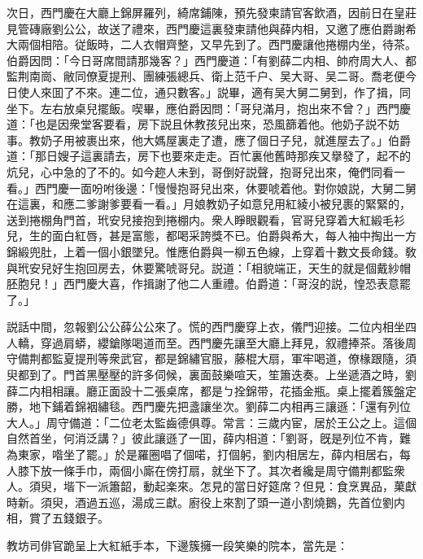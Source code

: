 次日，西門慶在大廳上錦屏羅列，綺席鋪陳，預先發柬請官客飲酒，因前日在皇莊見管磚廠劉公公，故送了禮來，西門慶這裏發柬請他與薛内相，又邀了應伯爵謝希大兩個相陪。従飯時，二人衣帽齊整，又早先到了。西門慶讓他捲棚内坐，待茶。伯爵因問：「今日哥席間請那幾客？」西門慶道：「有劉薛二内相、帥府周大人、都監荆南崗、敝同僚夏提刑、團練張總兵、衛上范千户、吴大哥、吴二哥。喬老便今日使人來囬了不來。連二位，通只數客。」説畢，適有吴大舅二舅到，作了揖，同坐下。左右放桌兒擺飯。喫畢，應伯爵因問：「哥兒滿月，抱出來不曾？」西門慶道：「也是因衆堂客要看，房下説且休教孩兒出來，恐風篩着他。他奶子説不妨事。教奶子用被裹出來，他大媽屋裏走了遭，應了個日子兒，就進屋去了。」伯爵道：「那日嫂子這裏請去，房下也要來走走。百忙裏他舊時那疾又擧發了，起不的炕兒，心中急的了不的。如今趂人未到，哥倒好説聲，抱哥兒出來，俺們同看一看。」西門慶一面吩咐後邊：「慢慢抱哥兒出來，休要唬着他。對你娘説，大舅二舅在這裏，和應二爹謝爹要看一看。」月娘教奶子如意兒用紅綾小被兒裹的緊緊的，送到捲棚角門首，玳安兒接抱到捲棚内。衆人睜眼觀看，官哥兒穿着大紅緞毛衫兒，生的面白紅唇，甚是富態，都喝采誇獎不已。伯爵與希大，每人袖中掏出一方錦緞兜肚，上着一個小銀墜兒。惟應伯爵與一柳五色線，上穿着十數文長命錢。敎與玳安兒好生抱回房去，休要驚唬哥兒。説道：「相貌端正，天生的就是個戴紗帽胚胞兒！」西門慶大喜，作揖謝了他二人重禮。伯爵道：「哥沒的説，惶恐表意罷了。」

説話中間，忽報劉公公薛公公來了。慌的西門慶穿上衣，儀門迎接。二位内相坐四人轎，穿過肩蟒，纓鎗隊喝道而至。西門慶先讓至大廳上拜見，叙禮捧茶。落後周守備荆都監夏提刑等衆武官，都是錦繡官服，藤棍大扇，軍牢喝道，僚椽跟隨，須臾都到了。門首黑壓壓的許多伺候，裏面鼓樂喧天，笙簫迭奏。上坐遞酒之時，劉薛二内相相讓。廳正面設十二張桌席，都是ㄅ拴錦带，花插金瓶。桌上擺着簇盤定勝，地下鋪着錦裀繡毯。西門慶先把盞讓坐次。劉薛二内相再三讓遜：「還有列位大人。」周守備道：「二位老太監齒德俱尊。常言：三歲内宦，居於王公之上。這個自然首坐，何消泛講？」彼此讓遜了一囬，薛内相道：「劉哥，旣是列位不肯，難為東家，喒坐了罷。」於是羅圈唱了個喏，打個躬，劉内相居左，薛内相居右，每人膝下放一條手巾，兩個小廝在傍打扇，就坐下了。其次者纔是周守備荆都監衆人。須臾，堦下一派簫韶，動起楽來。怎見的當日好筵席？但見：食烹異品，菓獻時新。須臾，酒過五巡，湯成三獻。廚役上來割了頭一道小割燒鵝，先首位劉内相，賞了五錢銀子。

教坊司俳官跪呈上大紅紙手本，下邊簇擁一段笑樂的院本，當先是：

